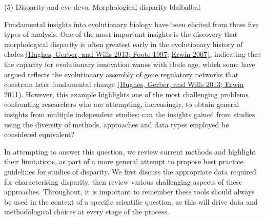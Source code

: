 \documentclass[12pt,letterpaper]{article}
\begin{document}
(5) Disparity and evo-devo. Morphological disparity blalbalbal

Fundamental insights into evolutionary biology have been elicited from these five types of analysis.
One of the most important insights is the discovery that morphological disparity is often greatest early in the evolutionary history of clades \href{https://paperpile.com/c/sTGYvp/xxh5+yqPw}{(Hughes, Gerber, and Wills 2013; Foote 1997;} \href{https://paperpile.com/c/sTGYvp/EPJ2}{Erwin 2007)}, indicating that the capacity for evolutionary innovation wanes with clade age, which some have argued reflects the evolutionary assembly of gene regulatory networks that constrain later fundamental change \href{https://paperpile.com/c/sTGYvp/xxh5+Z6l6}{(Hughes, Gerber, and Wills 2013; Erwin 2011)}.
However, this example highlights one of the most challenging problems confronting researchers who are attempting, increasingly, to obtain general insights from multiple independent studies: can the insights gained from studies using the diversity of methods, approaches and data types employed be considered equivalent?

In attempting to answer this question, we review current methods and highlight their limitations, as part of a more general attempt to propose best practice guidelines for studies of disparity.
We first discuss the appropriate data required for characterising disparity, then review various challenging aspects of these approaches.
Throughout, it is important to remember these tools should always be used in the context of a specific scientific question, as this will drive data and methodological choices at every stage of the process.
\end{document}
